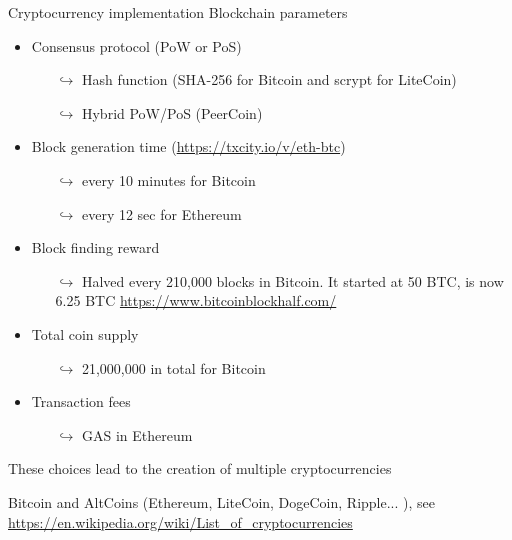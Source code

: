 \documentclass{beamer}
\begin{document}
\begin{frame}{Cryptocurrency implementation}
\scriptsize
Blockchain parameters
\begin{itemize}
  \item Consensus protocol (PoW or PoS) 
  \begin{itemize}
    \item[$\hookrightarrow$] \tiny{Hash function (SHA-256 for Bitcoin and scrypt for LiteCoin)}
    \item[$\hookrightarrow$] \tiny{Hybrid PoW/PoS (PeerCoin)}
  \end{itemize}
  \item Block generation time (\url{https://txcity.io/v/eth-btc}) \scriptsize
    \begin{itemize}
    \item[$\hookrightarrow$] \tiny{every 10 minutes for Bitcoin} 
    \item[$\hookrightarrow$] \tiny{every 12 sec for Ethereum} 
  \end{itemize}
  \item Block finding reward\scriptsize
  \begin{itemize}
    \item[$\hookrightarrow$] \tiny Halved every 210,000 blocks in Bitcoin. It started at 50 BTC, is now 6.25 BTC \url{https://www.bitcoinblockhalf.com/}
  \end{itemize}
  \item Total coin supply\scriptsize
    \begin{itemize}
    \item[$\hookrightarrow$] \tiny 21,000,000 in total for Bitcoin
  \end{itemize}
  \item Transaction fees\scriptsize
      \begin{itemize}
    \item[$\hookrightarrow$] \tiny GAS in Ethereum
  \end{itemize}
\end{itemize}
These choices lead to the creation of multiple cryptocurrencies 
\begin{tcolorbox}[enhanced,drop shadow, title=Examples]
     Bitcoin and AltCoins (Ethereum, LiteCoin, DogeCoin, Ripple... ), see \url{https://en.wikipedia.org/wiki/List_of_cryptocurrencies}
\end{tcolorbox}

\end{frame}
\end{document}

